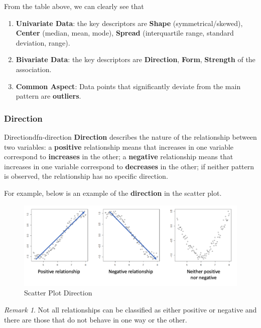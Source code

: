 \documentclass[math,code]{amznotes}
\theoremstyle{remark}
\newtheorem*{remark}{Remark}
\begin{document}
From the table above, we can clearly see that
\begin{enumerate}
    \item \textbf{Univariate Data}: the key descriptors are \textbf{Shape} (symmetrical/skewed), \textbf{Center} (median, mean, mode), \textbf{Spread} (interquartile range, standard deviation, range).
    \item \textbf{Bivariate Data}: the key descriptors are \textbf{Direction}, \textbf{Form}, \textbf{Strength} of the association.
    \item \textbf{Common Aspect}: Data points that significantly deviate from the main pattern are \textbf{outliers}.
\end{enumerate}
\subsubsection{Direction}
\begin{dfnbox}{Direction}{dfn-direction}
    {\color{red} \textbf{Direction}} describes the nature of the relationship between two variables: a \textbf{positive} relationship means that increases in one variable correspond to \textbf{increases} in the other; a \textbf{negative} relationship means that increases in one variable correspond to \textbf{decreases} in the other; if neither pattern is observed, the relationship has no specific direction.
\end{dfnbox}
For example, below is an example of the \textbf{direction} in the scatter plot.
\begin{figure}[H]
    \centering
    \includegraphics[width=0.75\linewidth]{images/chapter3-scatter-plot-direction.png}
    \caption{Scatter Plot Direction}
    \label{fig:chapter3-scatter-plot-direction}
\end{figure}
\begin{notebox}
    \begin{remark}
        Not all relationships can be classified as either positive or negative and there are those that do not behave in one way or the other.
    \end{remark}
\end{notebox}
\end{document}
